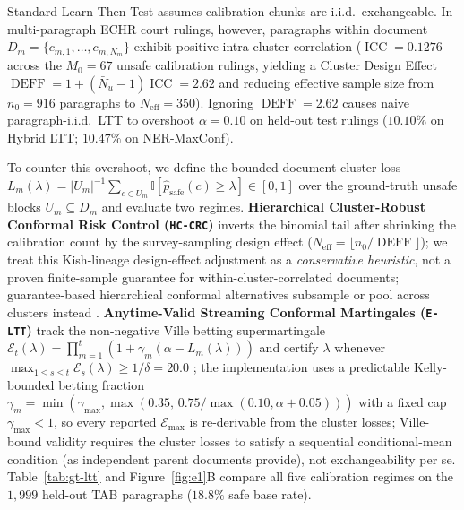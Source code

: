\documentclass{article}
\begin{document}
Standard Learn-Then-Test assumes calibration chunks are i.i.d.\ exchangeable. In multi-paragraph ECHR court rulings, however, paragraphs within document $D_m = \{c_{m,1},\dots,c_{m,N_m}\}$ exhibit positive intra-cluster correlation ($\operatorname{ICC} = 0.1276$ across the $M_0{=}67$ unsafe calibration rulings, yielding a Cluster Design Effect $\operatorname{DEFF} = 1 + (\bar{N}_u - 1)\operatorname{ICC} = \mathbf{2.62}$ and reducing effective sample size from $n_0{=}916$ paragraphs to $N_{\text{eff}}{=}350$). Ignoring $\operatorname{DEFF}{=}2.62$ causes naive paragraph-i.i.d.\ LTT to overshoot $\alpha{=}0.10$ on held-out test rulings ($10.10\%$ on Hybrid LTT; $10.47\%$ on NER-MaxConf).

To counter this overshoot, we define the bounded document-cluster loss $L_m(\lambda) = |U_m|^{-1} \sum_{c \in U_m} \mathbb{I}[\hat{p}_{\text{safe}}(c) \ge \lambda] \in [0, 1]$ over the ground-truth unsafe blocks $U_m \subseteq D_m$ and evaluate two regimes. \textbf{Hierarchical Cluster-Robust Conformal Risk Control (\texttt{HC-CRC})} inverts the binomial tail after shrinking the calibration count by the survey-sampling design effect ($N_{\text{eff}} = \lfloor n_0 / \operatorname{DEFF} \rfloor$); we treat this Kish-lineage design-effect adjustment as a \emph{conservative heuristic}, not a proven finite-sample guarantee for within-cluster-correlated documents; guarantee-based hierarchical conformal alternatives subsample or pool across clusters instead \citep{dunn2022hierarchical,lee2023hierarchical}. \textbf{Anytime-Valid Streaming Conformal Martingales (\texttt{E-LTT})} track the non-negative Ville betting supermartingale $\mathcal{E}_t(\lambda) = \prod_{m=1}^t (1 + \gamma_m(\alpha - L_m(\lambda)))$ and certify $\lambda$ whenever $\max_{1 \le s \le t} \mathcal{E}_s(\lambda) \ge 1/\delta = 20.0$ \citep{ramdas2023game,waudbysmith2024betting}; the implementation uses a predictable Kelly-bounded betting fraction $\gamma_m = \min(\gamma_{\max}, \max(0.35,\, 0.75/\max(0.10, \alpha + 0.05)))$ with a fixed cap $\gamma_{\max} < 1$, so every reported $\mathcal{E}_{\max}$ is re-derivable from the cluster losses; Ville-bound validity requires the cluster losses to satisfy a sequential conditional-mean condition (as independent parent documents provide), not exchangeability per se. Table~\ref{tab:gt-ltt} and Figure~\ref{fig:e1}B compare all five calibration regimes on the $1{,}999$ held-out TAB paragraphs ($18.8\%$ safe base rate).
\end{document}
